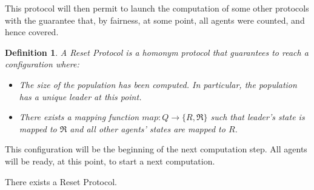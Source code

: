 \documentclass[UKenglish]{llncs}
\newtheorem{define}{Definition}
\newcommand\motnouv[1]{{\emph{#1}}}
\newcommand\RL{\mathfrak{R}}
\begin{document}
This protocol will then permit to launch the computation of some other protocols
with the guarantee that, by fairness, at some point, all agents were counted, and hence covered.


\begin{define}
A \motnouv{Reset Protocol} is a homonym protocol that guarantees to reach a configuration
where:
\begin{itemize}
\item The size of the population has been computed. In particular, the population has
a unique leader at this point.
\item There exists a mapping function $map:Q \to\{R,\RL\}$ such
  that leader's state is mapped to $\RL$ and 
all other agents' states are mapped to $R$. 
\end{itemize}

\end{define}
This configuration will be the beginning of the next computation step. All
agents will be ready, at this point, to start a next computation.
\begin{proposition}\label{prop:reset}
There exists a  Reset  Protocol.
\end{proposition}
\end{document}
